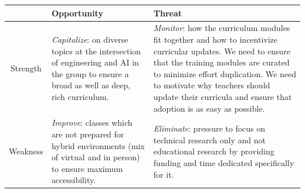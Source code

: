 \documentclass[11pt]{article}
\begin{document}

\begin{tabularx}{\textwidth}{|c|X|X|}
\hline
& Opportunity & Threat \\
\hline
Strength & \textit{Capitalize}: on diverse topics at the intersection of engineering and AI in the group to ensure a broad as well as deep, rich curriculum.  & \textit{Monitor}: how the curriculum modules fit together and how to incentivize curricular updates. We need to ensure that the training modules are curated to minimize effort duplication. We need to motivate why teachers should update their curricula and ensure that adoption is as easy as possible. \\
\hline
Weakness & \textit{Improve}: classes which are not prepared for hybrid environments (mix of virtual and in person) to ensure maximum accessibility.  & \textit{Eliminate}: pressure to focus on technical research only and not educational research by providing funding and time dedicated specifically for it.  \\
\hline
\end{tabularx}
\end{document}
